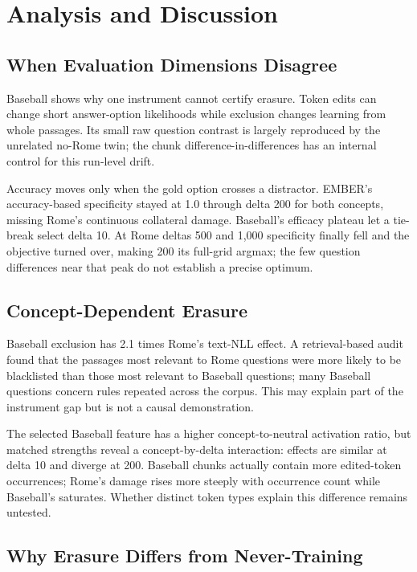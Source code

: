 \section{Analysis and Discussion}
\label{sec:discussion}

\subsection{When Evaluation Dimensions Disagree}

Baseball shows why one instrument cannot certify erasure. Token edits can
change short answer-option likelihoods while exclusion changes learning from
whole passages. Its small raw question contrast is largely reproduced by the
unrelated no-Rome twin; the chunk difference-in-differences has an internal
control for this run-level drift.

Accuracy moves only when the gold option crosses a distractor. EMBER's
accuracy-based specificity stayed at 1.0 through delta 200 for both concepts,
missing Rome's continuous collateral damage. Baseball's efficacy plateau let a
tie-break select delta 10. At Rome deltas 500 and 1,000 specificity finally
fell and the objective turned over, making 200 its full-grid argmax; the few
question differences near that peak do not establish a precise optimum.

\subsection{Concept-Dependent Erasure}

Baseball exclusion has 2.1 times Rome's text-NLL effect. A retrieval-based
audit found that the passages most relevant to Rome questions were more likely
to be blacklisted than those most relevant to Baseball questions; many Baseball
questions concern rules repeated across the corpus. This may explain part of
the instrument gap but is not a causal demonstration.

The selected Baseball feature has a higher concept-to-neutral activation ratio,
but matched strengths reveal a concept-by-delta interaction: effects are
similar at delta 10 and diverge at 200. Baseball chunks actually contain more
edited-token occurrences; Rome's damage rises more steeply with occurrence
count while Baseball's saturates. Whether distinct token types explain this
difference remains untested.

\subsection{Why Erasure Differs from Never-Training}


